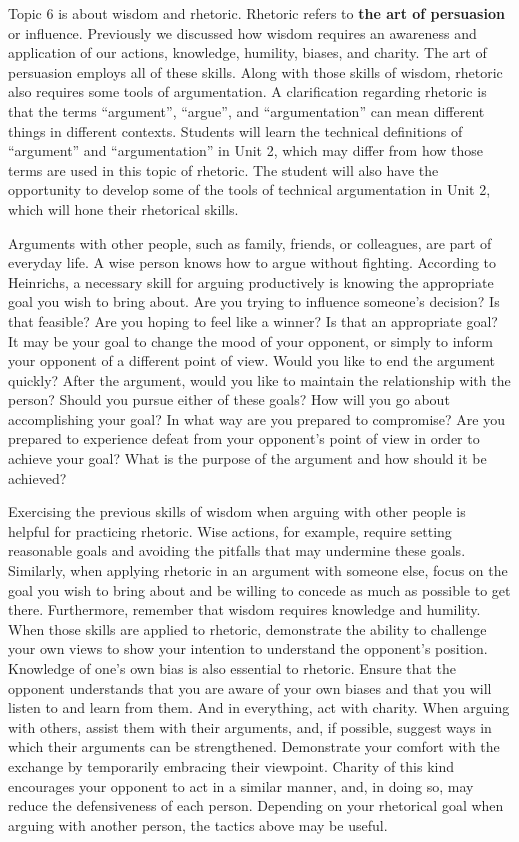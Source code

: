 \documentclass[
]{book}
\begin{document}
Topic 6 is about wisdom and rhetoric. Rhetoric refers to \textbf{the art of persuasion} or influence. Previously we discussed how wisdom requires an awareness and application of our actions, knowledge, humility, biases, and charity. The art of persuasion employs all of these skills. Along with those skills of wisdom, rhetoric also requires some tools of argumentation. A clarification regarding rhetoric is that the terms ``argument'', ``argue'', and ``argumentation'' can mean different things in different contexts. Students will learn the technical definitions of ``argument'' and ``argumentation'' in Unit 2, which may differ from how those terms are used in this topic of rhetoric. The student will also have the opportunity to develop some of the tools of technical argumentation in Unit 2, which will hone their rhetorical skills.

Arguments with other people, such as family, friends, or colleagues, are part of everyday life. A wise person knows how to argue without fighting. According to Heinrichs, a necessary skill for arguing productively is knowing the appropriate goal you wish to bring about. Are you trying to influence someone's decision? Is that feasible? Are you hoping to feel like a winner? Is that an appropriate goal? It may be your goal to change the mood of your opponent, or simply to inform your opponent of a different point of view. Would you like to end the argument quickly? After the argument, would you like to maintain the relationship with the person? Should you pursue either of these goals? How will you go about accomplishing your goal? In what way are you prepared to compromise? Are you prepared to experience defeat from your opponent's point of view in order to achieve your goal? What is the purpose of the argument and how should it be achieved?

Exercising the previous skills of wisdom when arguing with other people is helpful for practicing rhetoric. Wise actions, for example, require setting reasonable goals and avoiding the pitfalls that may undermine these goals. Similarly, when applying rhetoric in an argument with someone else, focus on the goal you wish to bring about and be willing to concede as much as possible to get there. Furthermore, remember that wisdom requires knowledge and humility. When those skills are applied to rhetoric, demonstrate the ability to challenge your own views to show your intention to understand the opponent's position. Knowledge of one's own bias is also essential to rhetoric. Ensure that the opponent understands that you are aware of your own biases and that you will listen to and learn from them. And in everything, act with charity. When arguing with others, assist them with their arguments, and, if possible, suggest ways in which their arguments can be strengthened. Demonstrate your comfort with the exchange by temporarily embracing their viewpoint. Charity of this kind encourages your opponent to act in a similar manner, and, in doing so, may reduce the defensiveness of each person. Depending on your rhetorical goal when arguing with another person, the tactics above may be useful.
\end{document}
